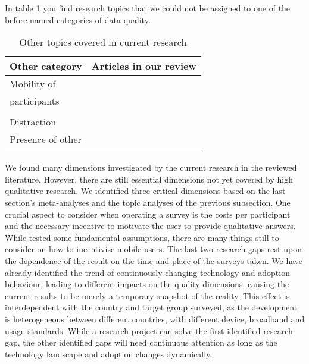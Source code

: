 In table \ref{tab: other} you find research topics that we could not be assigned to one of the before named categories of data quality.

\begin{table}
    \centering
    \begin{tabular}{ll}
        \toprule
        Other category & Articles in our review\\
        \midrule
        Mobility of & \cite{de_bruijne_comparing_2013, mavletova_data_2013}\\
        participants & \cite{antoun_effects_2017, mavletova_sensitive_2013}\\
        & \cite{toninelli_smartphones_2016}\\
        Distraction & \cite{antoun_effects_2017, toninelli_smartphones_2016}\\
        Presence of other & \cite{antoun_effects_2017, mavletova_sensitive_2013}\\
        & \cite{toninelli_smartphones_2016}\\
        \bottomrule
    \end{tabular}
    \caption{Other topics covered in current research}
    \label{tab: other}
\end{table}

We found many dimensions investigated by the current research in the reviewed literature. However, there are still essential dimensions not yet covered by high qualitative research. We identified three critical dimensions based on the last section's meta-analyses and the topic analyses of the previous subsection. One crucial aspect to consider when operating a survey is the costs per participant and the necessary incentive to motivate the user to provide qualitative answers. While \cite{mavletova_device_2016} tested some fundamental assumptions, there are many things still to consider on how to incentivise mobile users. The last two research gaps rest upon the dependence of the result on the time and place of the surveys taken. We have already identified the trend of continuously changing technology and adoption behaviour, leading to different impacts on the quality dimensions, causing the current results to be merely a temporary snapshot of the reality. This effect is interdependent with the country and target group surveyed, as the development is heterogeneous between different countries, with different device, broadband and usage standards. While a research project can solve the first identified research gap, the other identified gaps will need continuous attention as long as the technology landscape and adoption changes dynamically. 


